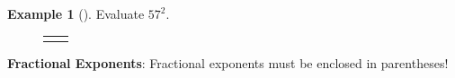 \documentclass[10pt,]{book}
\newcommand{\terminology}[1]{\textbf{#1}}
\theoremstyle{plain}
\theoremstyle{definition}
\theoremstyle{definition}
\newtheorem{example}[theorem]{Example}
\theoremstyle{definition}
\numberwithin{equation}{part}
\newlength{\panelmax}
\begin{document}
\begin{example}[]\label{example-101}
Evaluate \(57^{2}\).%
{%
\setlength{\panelmax}{0pt}
\newsavebox{\panelboxAILp}
\newlength{\phAILp}\setlength{\phAILp}{\ht\panelboxAILp+\dp\panelboxAILp}
\settototalheight{\phAILp}{\usebox{\panelboxAILp}}
\setlength{\panelmax}{\maxof{\panelmax}{\phAILp}}
\newsavebox{\panelboxAIMp}
\newlength{\phAIMp}\setlength{\phAIMp}{\ht\panelboxAIMp+\dp\panelboxAIMp}
\settototalheight{\phAIMp}{\usebox{\panelboxAIMp}}
\setlength{\panelmax}{\maxof{\panelmax}{\phAIMp}}
\leavevmode%
\setlength{\tabcolsep}{0.025\textwidth}
\begin{figure}
\begin{tabular}{@{}*{2}{c}@{}}
\begin{minipage}[c][\panelmax][t]{0.6\textwidth}\usebox{\panelboxAILp}\end{minipage}&
\begin{minipage}[c][\panelmax][t]{0.35\textwidth}\usebox{\panelboxAIMp}\end{minipage}\end{tabular}
\end{figure}
}%
\end{example}
\par
\terminology{Fractional Exponents}: Fractional exponents must be enclosed in parentheses!%
\end{document}
